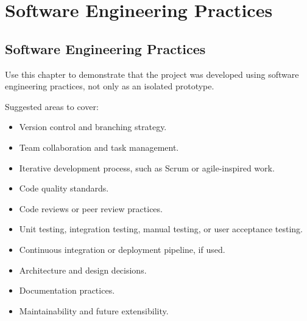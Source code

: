 \chapter{Software Engineering Practices}
\label{ch:software-engineering-practices}

\section{Software Engineering Practices}
\label{sec:software-engineering-practices}

Use this chapter to demonstrate that the project was developed using software engineering practices, not only as an isolated prototype.

Suggested areas to cover:
\begin{itemize}[noitemsep]
  \item Version control and branching strategy.
  \item Team collaboration and task management.
  \item Iterative development process, such as Scrum or agile-inspired work.
  \item Code quality standards.
  \item Code reviews or peer review practices.
  \item Unit testing, integration testing, manual testing, or user acceptance testing.
  \item Continuous integration or deployment pipeline, if used.
  \item Architecture and design decisions.
  \item Documentation practices.
  \item Maintainability and future extensibility.
\end{itemize}

